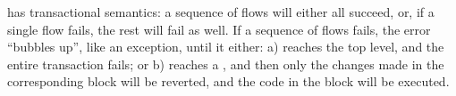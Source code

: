 \documentclass[nonacm, dvipsnames, usenames, sigconf]{acmart}
\begin{document}
\langName has transactional semantics: a sequence of flows will either all succeed, or, if a single flow fails, the rest will fail as well.
If a sequence of flows fails, the error ``bubbles up'', like an exception, until it either: a) reaches the top level, and the entire transaction fails; or b) reaches a , and then only the changes made in the corresponding  block will be reverted, and the code in the  block will be executed.



\end{document}
